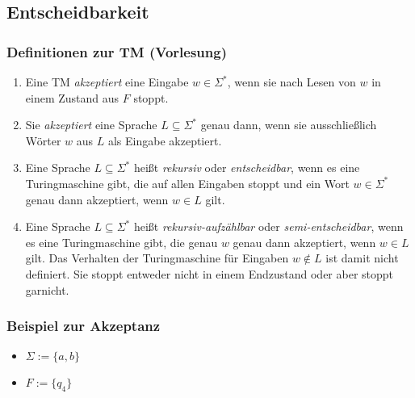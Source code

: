 \documentclass{beamer}
\begin{document}
{\subsection{Entscheidbarkeit}
\begin{frame}
 \frametitle{Definitionen zur TM (Vorlesung)}
 \begin{enumerate}
  \item Eine TM \emph{akzeptiert} eine Eingabe $w \in \Sigma^*$, wenn sie nach Lesen von $w$ in einem Zustand aus $F$ stoppt.
  \item Sie \emph{akzeptiert} eine Sprache $L \subseteq \Sigma^*$ genau dann, wenn sie ausschließlich Wörter $w$ aus $L$ als Eingabe akzeptiert.
  \item Eine Sprache $L \subseteq \Sigma^*$ heißt \emph{rekursiv} oder \emph{entscheidbar}, wenn es eine Turingmaschine gibt, die auf allen Eingaben stoppt und
	ein Wort $w \in \Sigma^*$ genau dann akzeptiert, wenn $w \in L$ gilt.
  \item Eine Sprache $L \subseteq \Sigma^*$ heißt \emph{rekursiv-aufzählbar} oder \emph{semi-entscheidbar}, wenn es eine Turingmaschine gibt, 
	die genau $w$ genau dann akzeptiert, wenn $w \in L$ gilt. Das Verhalten der Turingmaschine für Eingaben $w \not\in L$ ist damit nicht definiert.
	Sie stoppt entweder nicht in einem Endzustand oder aber stoppt garnicht.
 \end{enumerate}
\end{frame}

\begin{frame}
 \frametitle{Beispiel zur Akzeptanz}
 \begin{itemize}
  \item $\Sigma := \{a, b\}$  
  \item $F := \{q_4\}$
 \end{itemize}
\vspace{-2cm}
 \end{frame}

}
\end{document}
